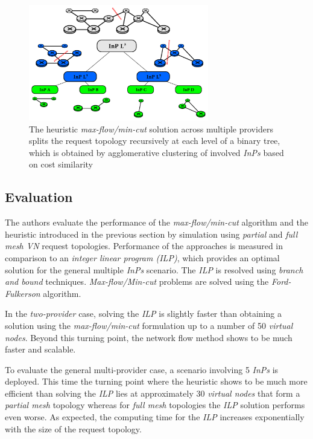\documentclass[prodmode,acmtomccap]{acmlarge}
\begin{document}
\begin{figure}[htb]
	\centering
	\includegraphics[width=0.7\textwidth]{recursive_heuristic}
	\caption{The heuristic \emph{max-flow/min-cut} solution across multiple providers splits the request topology recursively at each level of a binary tree, which is obtained 
		by agglomerative clustering of involved \emph{InPs} based on cost similarity}
	\label{fig6}
\end{figure}

\subsection{Evaluation}
The authors evaluate the performance of the \emph{max-flow/min-cut} algorithm and the heuristic introduced in the previous section
by simulation using \emph{partial} and \emph{full mesh VN} request topologies. 
Performance of the approaches is measured in comparison to an \emph{integer linear program (ILP)}, which provides an optimal solution for the general multiple \emph{InPs} scenario.
The \emph{ILP} is resolved using \emph{branch and bound} techniques. \emph{Max-flow/Min-cut} problems are solved using the \emph{Ford-Fulkerson} algorithm.

In the \emph{two-provider} case, solving the \emph{ILP} is slightly faster than obtaining a solution using the \emph{max-flow/min-cut} formulation up to a number of
50 \emph{virtual nodes}. Beyond this turning point, the network flow method shows to be much faster and scalable.

To evaluate the general multi-provider case, a scenario involving 5 \emph{InPs} is deployed. This time the turning point where the heuristic shows to be much more efficient than solving the \emph{ILP}
lies at approximately 30 \emph{virtual nodes} that form a \emph{partial mesh} topology whereas for \emph{full mesh} topologies the \emph{ILP} solution performs even worse.
As expected, the computing time for the \emph{ILP} increases exponentially with the size of the request topology.
\end{document}
